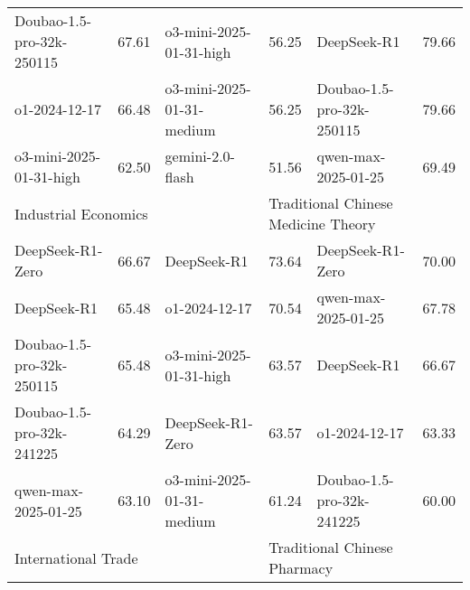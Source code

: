 {\begin{longtable}{p{4.2cm}>{\centering\arraybackslash} p{0.8cm}|p{4.2cm} >{\centering\arraybackslash} p{0.8cm}|p{4.2cm} >{\centering\arraybackslash} p{0.8cm}}
\cellcolor{pink!5} Doubao-1.5-pro-32k-250115 & \cellcolor{pink!2}67.61 & \cellcolor{blue!5} o3-mini-2025-01-31-high & \cellcolor{blue!2} 56.25 & \cellcolor{yellow!5} DeepSeek-R1 & \cellcolor{yellow!2} 79.66\\
\cellcolor{pink!5} o1-2024-12-17 & \cellcolor{pink!2}66.48 & \cellcolor{blue!5} o3-mini-2025-01-31-medium & \cellcolor{blue!2} 56.25 & \cellcolor{yellow!5} Doubao-1.5-pro-32k-250115 & \cellcolor{yellow!2} 79.66\\
\cellcolor{pink!5} o3-mini-2025-01-31-high & \cellcolor{pink!2}62.50 & \cellcolor{blue!5} gemini-2.0-flash & \cellcolor{blue!2} 51.56 & \cellcolor{yellow!5} qwen-max-2025-01-25 & \cellcolor{yellow!2} 69.49\\
\hline
\multicolumn{2}{p{5.15cm}|}{\cellcolor{pink!10} \centering Industrial Economics} & \multicolumn{2}{p{5.15cm}|}{\cellcolor{blue!10} \centering Heat Transfer} & \multicolumn{2}{p{5.15cm}}{\cellcolor{yellow!10} \centering Traditional Chinese Medicine Theory}\\
\hline
\cellcolor{pink!5} DeepSeek-R1-Zero & \cellcolor{pink!2}66.67 & \cellcolor{blue!5} DeepSeek-R1 & \cellcolor{blue!2} 73.64 & \cellcolor{yellow!5} DeepSeek-R1-Zero & \cellcolor{yellow!2} 70.00\\
\cellcolor{pink!5} DeepSeek-R1 & \cellcolor{pink!2}65.48 & \cellcolor{blue!5} o1-2024-12-17 & \cellcolor{blue!2} 70.54 & \cellcolor{yellow!5} qwen-max-2025-01-25 & \cellcolor{yellow!2} 67.78\\
\cellcolor{pink!5} Doubao-1.5-pro-32k-250115 & \cellcolor{pink!2}65.48 & \cellcolor{blue!5} o3-mini-2025-01-31-high & \cellcolor{blue!2} 63.57 & \cellcolor{yellow!5} DeepSeek-R1 & \cellcolor{yellow!2} 66.67\\
\cellcolor{pink!5} Doubao-1.5-pro-32k-241225 & \cellcolor{pink!2}64.29 & \cellcolor{blue!5} DeepSeek-R1-Zero & \cellcolor{blue!2} 63.57 & \cellcolor{yellow!5} o1-2024-12-17 & \cellcolor{yellow!2} 63.33\\
\cellcolor{pink!5} qwen-max-2025-01-25 & \cellcolor{pink!2}63.10 & \cellcolor{blue!5} o3-mini-2025-01-31-medium & \cellcolor{blue!2} 61.24 & \cellcolor{yellow!5} Doubao-1.5-pro-32k-241225 & \cellcolor{yellow!2} 60.00\\
\hline
\multicolumn{2}{p{5.15cm}|}{\cellcolor{pink!10} \centering International Trade} & \multicolumn{2}{p{5.15cm}|}{\cellcolor{blue!10} \centering Internal Combustion Engineering} & \multicolumn{2}{p{5.15cm}}{\cellcolor{yellow!10} \centering Traditional Chinese Pharmacy}\\
\hline

\end{longtable}}
